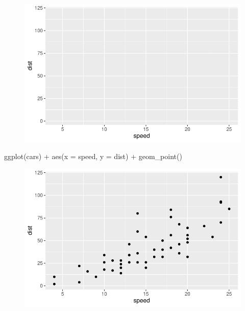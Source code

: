 \documentclass[
  letterpaper,
  DIV=11,
  numbers=noendperiod]{scrartcl}
\newenvironment{Shaded}{\begin{snugshade}}{\end{snugshade}}
\newcommand{\AttributeTok}[1]{\textcolor[rgb]{0.40,0.45,0.13}{#1}}
\newcommand{\FunctionTok}[1]{\textcolor[rgb]{0.28,0.35,0.67}{#1}}
\newcommand{\NormalTok}[1]{\textcolor[rgb]{0.00,0.23,0.31}{#1}}
\newcommand{\SpecialCharTok}[1]{\textcolor[rgb]{0.37,0.37,0.37}{#1}}
\begin{document}
\begin{figure}[H]

{\centering \includegraphics{class05_files/figure-pdf/unnamed-chunk-3-1.pdf}

}

\end{figure}

\begin{Shaded}
\begin{Highlighting}[]
\FunctionTok{ggplot}\NormalTok{(cars) }\SpecialCharTok{+}
  \FunctionTok{aes}\NormalTok{(}\AttributeTok{x =}\NormalTok{ speed, }\AttributeTok{y =}\NormalTok{ dist) }\SpecialCharTok{+}
  \FunctionTok{geom\_point}\NormalTok{()}
\end{Highlighting}
\end{Shaded}

\begin{figure}[H]

{\centering \includegraphics{class05_files/figure-pdf/unnamed-chunk-4-1.pdf}

}

\end{figure}
\end{document}
